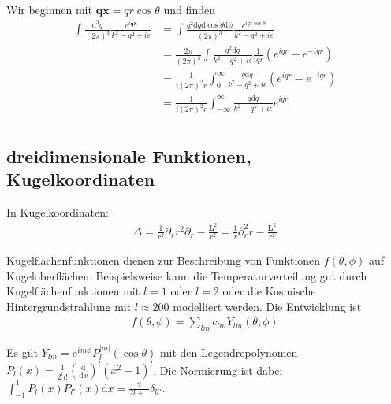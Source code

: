 \documentclass[11pt,a4paper]{report}
\begin{document}
Wir beginnen mit $\mathbf{q} \mathbf{x} = q r \cos \theta$ und finden 
\begin{align*}
    \int \frac{\mathrm{d}^3 q}{(2\pi)^3} \frac{e^{i \mathbf{q} \mathbf{x}}}{k^2 - q^2 + i \varepsilon} &= \int \frac{q^2 \mathrm{d}q \mathrm{d}\cos \theta \mathrm{d}\phi}{(2\pi)^3} \frac{e^{i q r \cos \theta}}{k^2 - q^2 + i \varepsilon} \\ 
    &= \frac{2\pi}{(2\pi)^3} \int \frac{q^2 \mathrm{d}q}{k^2 - q^2 + i \epsilon} \frac{1}{i q r} \left(e^{i q r} - e^{-i q r}\right) \\ 
    &= \frac{1}{i (2\pi)^2 r} \int_0^\infty \frac{q \mathrm{d}q}{k^2 - q^2 + i \epsilon} \left(e^{i q r} - e^{-i q r}\right) \\ 
    &= \frac{1}{i (2\pi)^2 r} \int_{-\infty}^\infty \frac{q \mathrm{d}q}{k^2 - q^2 + i \epsilon} e^{i q r} \\ 
\end{align*}

\subsection{dreidimensionale Funktionen, Kugelkoordinaten}

In Kugelkoordinaten:
\begin{align*}
    \Delta = \frac{1}{r^2} \partial_r r^2 \partial_r - \frac{\mathbf{L}^2}{r^2} = \frac{1}{r} \partial_r^2 r - \frac{\mathbf{L}^2}{r^2}
\end{align*}

Kugelflächenfunktionen dienen zur Beschreibung von Funktionen $f(\theta, \phi)$ auf Kugeloberflächen.
Beispielsweise kann die Temperaturverteilung gut durch Kugelflächenfunktionen mit $l=1$ oder $l=2$ oder die Kosmische Hintergrundstrahlung mit $l \approx 200$ modelliert werden.
Die Entwicklung ist 
\begin{align*}
    f(\theta, \phi) = \sum_{l m} c_{l m} Y_{l m}(\theta, \phi)
\end{align*}

Es gilt $Y_{l m} = e^{i m \phi} P_l^{|m|}(\cos \theta)$ mit den Legendrepolynomen $P_l(x) = \frac{1}{2^l l!} \left(\frac{\mathrm{d}}{\mathrm{d}x}\right)^l (x^2 - 1)^l$.
Die Normierung ist dabei $\int_{-1}^1 P_{l}(x) P_{l'}(x) \mathrm{d}x = \frac{2}{2 l + 1} \delta_{l l'}$.
\end{document}
